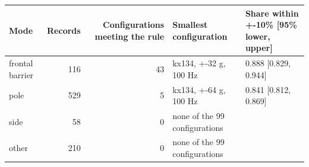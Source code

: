 \begin{tabular}{lrrll}
\toprule
Mode & Records & Configurations meeting the rule & Smallest configuration & Share within +-10\% [95\% lower, upper] \\
\midrule
frontal barrier & 116 & 43 & kx134, +-32 g, 100 Hz & 0.888 [0.829, 0.944] \\
pole & 529 & 5 & kx134, +-64 g, 100 Hz & 0.841 [0.812, 0.869] \\
side & 58 & 0 & none of the 99 configurations &  \\
other & 210 & 0 & none of the 99 configurations &  \\
\bottomrule
\end{tabular}
